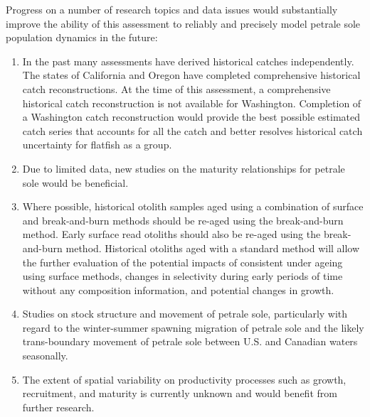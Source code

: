 \documentclass[12pt,]{article}
\begin{document}
Progress on a number of research topics and data issues would
substantially improve the ability of this assessment to reliably and
precisely model petrale sole population dynamics in the future:

\begin{enumerate}

\item In the past many assessments have derived historical catches independently. The states of California and Oregon have completed comprehensive historical catch reconstructions. At the time of this assessment, a comprehensive historical catch reconstruction is not available for Washington. Completion of a Washington catch reconstruction would provide the best possible estimated catch series that accounts for all the catch and better resolves historical catch uncertainty for flatfish as a group.

\item Due to limited data, new studies on the maturity relationships for petrale sole would be beneficial.

\item Where possible, historical otolith samples aged using a combination of surface and break-and-burn methods should be re-aged using the break-and-burn method. Early surface read otoliths should also be re-aged using the break-and-burn method. Historical otoliths aged with a standard method will allow the further evaluation of the potential impacts of consistent under ageing using surface methods, changes in selectivity during early periods of time without any composition information, and potential changes in growth.

\item Studies on stock structure and movement of petrale sole, particularly with regard to the winter-summer spawning migration of petrale sole and the likely trans-boundary movement of petrale sole between U.S. and Canadian waters seasonally.

\item The extent of spatial variability on productivity processes such as growth, recruitment, and maturity is currently unknown and would benefit from further research.

\end{enumerate}
\end{document}
